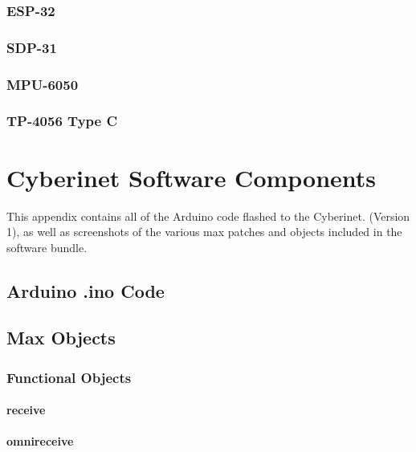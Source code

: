 \subsection{ESP-32}
\vspace{5mm}

\subsection{SDP-31}
\vspace{5mm}

\subsection{MPU-6050}
\vspace{5mm}

\subsection{TP-4056 Type C}




\chapter{Cyberinet Software Components}
This appendix contains all of the Arduino code flashed to the Cyberinet. (Version 1), as well as screenshots of the various max patches and objects included in the software bundle.

\section{Arduino .ino Code}

\section{Max Objects}

\subsection{Functional Objects}

\subsubsection{receive~}
\vspace{5mm}

\subsubsection{omnireceive~}
\vspace{5mm}

